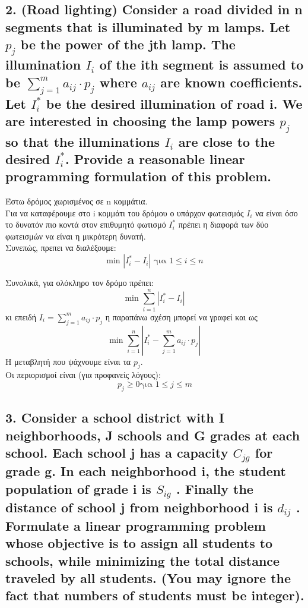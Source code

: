 \documentclass[12pt]{article}
\newcommand{\abs}[1]{\left\lvert#1\right\rvert}
\begin{document}
\vspace{2in}

\pagebreak

\subsection*{2. (Road lighting) Consider a road divided in n segments that is illuminated by m
	lamps. Let \(p_{j}\) be the power of the jth lamp. The illumination \(I_{i}\) of the ith segment is assumed
	to be \(\sum_{j=1}^{m}{a_{ij} \cdot p_{j}}\)
	where \(a_{ij}\) are known coefficients. Let \(I_{i}^{*}\) be the desired illumination of road i.
	We are interested in choosing the lamp powers \(p_{j}\) so that the illuminations \(I_{i}\) are close to the
	desired \(I_{i}^{*}\). Provide a reasonable linear programming formulation of this problem.}

Έστω δρόμος χωρισμένος σε n κομμάτια. \\

Για να καταφέρουμε στο i κομμάτι του δρόμου ο υπάρχον φωτεισμός \(I_{i}\) να είναι όσο το δυνατόν πιο κοντά στον επιθυμητό φωτισμό \(I_{i}^{*}\) πρέπει η διαφορά των δύο φωτεισμών να είναι η μικρότερη δυνατή. \\

Συνεπώς, πρεπει να διαλέξουμε:
\[ \mbox{min }\abs{ I_{i}^{*} - I_{i} } \mbox{ για } 1 \leq i \leq n \]

Συνολικά, για ολόκληρο τον δρόμο πρέπει: \\
\[ \mbox{min } \sum_{i=1}^{n}{\abs{ I_{i}^{*} - I_{i} }}  \]
κι επειδή \(I_{i} = \sum_{j=1}^{m}{a_{ij} \cdot p_{j}}\) η παραπάνω σχέση μπορεί να γραφεί και ως \\
\[ \mbox{min } \sum_{i=1}^{n}{\abs{ I_{i}^{*} - \sum_{j=1}^{m}{a_{ij} \cdot p_{j}} }}  \]
Η μεταβλητή που ψάχνουμε είναι τα \(p_{j}\). \\

Οι περιορισμοί είναι (για προφανείς λόγους): \\
\[ p_{j} \geq 0 \mbox{για } 1 \leq j \leq m \]

\vspace{2in}

\pagebreak

\subsection*{3. Consider a school district with I neighborhoods, J schools and G grades
	at each school. Each school j has a capacity \(C_{jg}\) for grade g. In each neighborhood i, the
	student population of grade i is \(S_{ig}\) . Finally the distance of school j from neighborhood i is \(d_{ij}\) .
	Formulate a linear programming problem whose objective is to assign all students to schools,
	while minimizing the total distance traveled by all students. (You may ignore the fact that
	numbers of students must be integer).}
\end{document}
